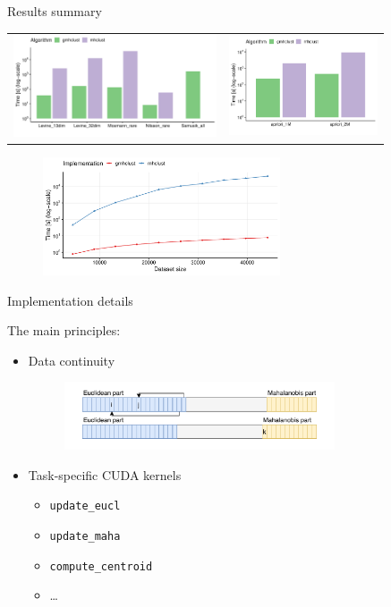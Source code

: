 \documentclass[10pt]{beamer}
\begin{document}
\begin{frame}{Results summary}
	
	\begin{tabular}{cc}
		\includegraphics[width=6cm]{../img/mixed_perf_comp} & \includegraphics[width=4.4cm]{../img/apriori_perf_comp} \\
	\end{tabular}
	\begin{figure}
		\includegraphics[width=7cm]{../img/single_perf_comp}
	\end{figure}
	
\end{frame}


\begin{frame}{Implementation details}
	
	The main principles:
	\begin{itemize}
		\item Data continuity
		\begin{figure}
			\includegraphics[width=8cm]{../img/data}
		\end{figure}
		
		\item Task-specific CUDA kernels
		\begin{itemize}
			\item \texttt{update\_eucl}
			\item \texttt{update\_maha}
			\item \texttt{compute\_centroid}
			\item \dots
		\end{itemize}
	\end{itemize}

\end{frame}
\end{document}
